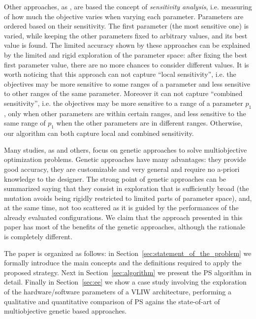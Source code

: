 Other approaches, as \cite{fornaciari_codes01,palesi_iwsoc02}, are based the concept of \emph{sensitivity analysis}, i.e. measuring of how much the objective varies when varying each parameter.
Parameters are ordered based on their sensitivity. The first parameter (the most sensitive one) is varied, while keeping the other parameters fixed to arbitrary values, and its best value is found. The limited accuracy shown by these approaches can be explained by the limited and rigid exploration of the parameter
space: after fixing the best first parameter value, there are no more chances to consider different values. It is worth noticing that this approach can not capture
``local sensitivity'', i.e. the objectives may be more sensitive to some
ranges of a parameter and less sensitive to other ranges of the same
parameter. Moreover it can not capture ``combined sensitivity'', i.e. the objectives may be
more sensitive to a range of a parameter $p_{1}$, only when other
parameters are within certain ranges, and less sensitive to the same
range of $p_{1}$ when the other parameters are in different ranges. Otherwise, our algorithm can both capture local and combined sensitivity.


Many studies, as \cite{coello_easmop} and others, focus on genetic approaches to solve multiobjective
optimization problems. Genetic approaches
have many advantages: they provide good accuracy, they are customizable and very general
and require no a-priori knowledge to the designer.  The strong
point of genetic approaches can be summarized saying that they consist
in exploration that is sufficiently broad (the mutation avoids being rigidly restricted to limited parts of parameter space), and, at the same time, not too scattered as it is guided by the performances of
the already evaluated configurations. We claim that the
approach presented in this paper has most of the benefits of the genetic
approaches, although the rationale is completely different.

The paper is organized as follows: in
Section~\ref{sec:statement_of_the_problem} we formally introduce the
main concepts and the definitions required to apply the proposed strategy. Next in
Section~\ref{sec:algorithm} we present the PS algorithm in detail.
Finally in Section~\ref{sec:ee} we show a case study involving the
exploration of the hardware/software parameters of a VLIW
architecture, performing a qualitative and quantitative comparison of
PS agains the state-of-art of multiobjective genetic based approaches.
